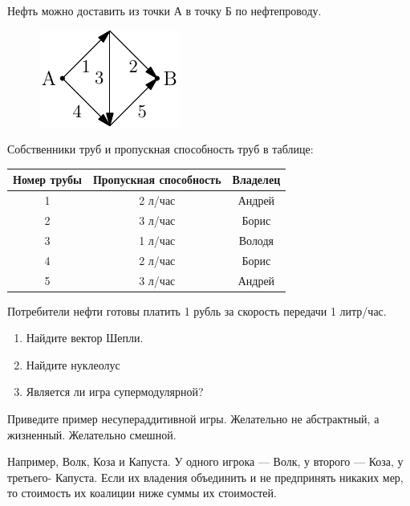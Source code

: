 \begin{problem}[Нефтепровод.]

Нефть можно доставить из точки А в точку Б по нефтепроводу.

\begin{figure}[htbp]
	\includegraphics{coop_nefteprovod.pdf}
\end{figure}

Собственники труб и пропускная способность труб в таблице:

\begin{tabular}{|c|c|c|}

\hline
Номер трубы & Пропускная способность & Владелец \\
\hline
1 & 2 л/час & Андрей \\
2 & 3 л/час & Борис \\
3 & 1 л/час & Володя \\
4 & 2 л/час & Борис \\
5 & 3 л/час & Андрей \\
\hline
\end{tabular}

Потребители нефти готовы платить 1 рубль за скорость передачи 1 литр/час.
\begin{enumerate}
\item Найдите вектор Шепли.
\item Найдите нуклеолус

\item Является ли игра супермодулярной?
\end{enumerate}



\begin{sol}

\end{sol}
\end{problem}






\begin{problem}
Приведите пример несупераддитивной игры. Желательно не абстрактный, а жизненный. Желательно смешной.



\begin{sol}
Например, Волк, Коза и Капуста. У одного игрока --- Волк, у второго --- Коза, у третьего- Капуста. Если их владения объединить и не предпринять никаких мер, то стоимость их коалиции ниже суммы их стоимостей.
\end{sol}
\end{problem}





